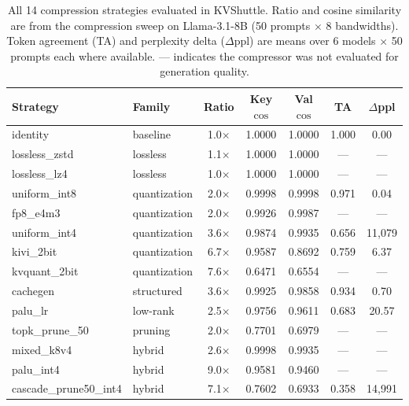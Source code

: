 \begin{table}[t]
\centering
\caption{All 14 compression strategies evaluated in KVShuttle. Ratio and cosine similarity are from the compression sweep on Llama-3.1-8B (50 prompts $\times$ 8 bandwidths). Token agreement (TA) and perplexity delta ($\Delta$ppl) are means over 6 models $\times$ 50 prompts each where available. --- indicates the compressor was not evaluated for generation quality.}
\label{tab:full_compressors}
\small
\begin{tabular}{llccccc}
\toprule
\textbf{Strategy} & \textbf{Family} & \textbf{Ratio} & \textbf{Key $\cos$} & \textbf{Val $\cos$} & \textbf{TA} & \textbf{$\Delta$ppl} \\
\midrule
  identity & baseline & 1.0$\times$ & 1.0000 & 1.0000 & 1.000 & 0.00 \\
\midrule
  lossless\_zstd & lossless & 1.1$\times$ & 1.0000 & 1.0000 & --- & --- \\
  lossless\_lz4 & lossless & 1.0$\times$ & 1.0000 & 1.0000 & --- & --- \\
\midrule
  uniform\_int8 & quantization & 2.0$\times$ & 0.9998 & 0.9998 & 0.971 & 0.04 \\
  fp8\_e4m3 & quantization & 2.0$\times$ & 0.9926 & 0.9987 & --- & --- \\
  uniform\_int4 & quantization & 3.6$\times$ & 0.9874 & 0.9935 & 0.656 & 11,079 \\
  kivi\_2bit & quantization & 6.7$\times$ & 0.9587 & 0.8692 & 0.759 & 6.37 \\
  kvquant\_2bit & quantization & 7.6$\times$ & 0.6471 & 0.6554 & --- & --- \\
\midrule
  cachegen & structured & 3.6$\times$ & 0.9925 & 0.9858 & 0.934 & 0.70 \\
\midrule
  palu\_lr & low-rank & 2.5$\times$ & 0.9756 & 0.9611 & 0.683 & 20.57 \\
\midrule
  topk\_prune\_50 & pruning & 2.0$\times$ & 0.7701 & 0.6979 & --- & --- \\
\midrule
  mixed\_k8v4 & hybrid & 2.6$\times$ & 0.9998 & 0.9935 & --- & --- \\
  palu\_int4 & hybrid & 9.0$\times$ & 0.9581 & 0.9460 & --- & --- \\
  cascade\_prune50\_int4 & hybrid & 7.1$\times$ & 0.7602 & 0.6933 & 0.358 & 14,991 \\
\bottomrule
\end{tabular}
\end{table}